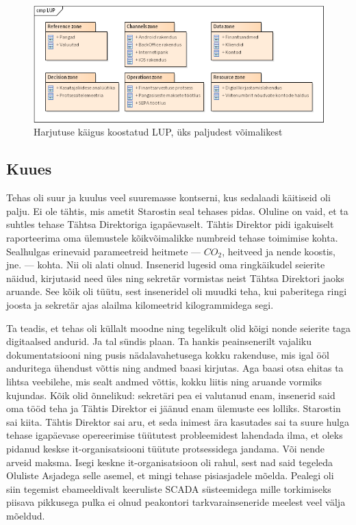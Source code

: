\documentclass[nobib]{tufte-handout}
\begin{document}
\begin{figure}%
\begin{center}
  \includegraphics[width=\linewidth]{harjutus_lup}
  \caption{Harjutuse käigus koostatud LUP, üks paljudest võimalikest}
  \label{fig:harjutus}
\end{center}
\end{figure}

\subsection{Kuues}
 Tehas oli suur ja kuulus veel suuremasse kontserni, kus sedalaadi käitiseid oli palju. Ei ole tähtis, mis ametit Starostin seal tehases pidas. Oluline on vaid, et ta suhtles tehase Tähtsa Direktoriga igapäevaselt. Tähtis Direktor pidi igakuiselt raporteerima oma ülemustele kõikvõimalikke numbreid tehase toimimise kohta. Sealhulgas erinevaid parameetreid heitmete --- $CO_2$, heitveed ja nende koostis, jne. --- kohta. Nii oli alati olnud. Insenerid lugesid oma ringkäikudel seierite näidud, kirjutasid need üles ning sekretär vormistas neist Tähtsa Direktori jaoks aruande. See kõik oli tüütu, sest inseneridel oli muudki teha, kui paberitega ringi joosta ja sekretär ajas alailma kilomeetrid kilogrammidega segi. 

 Ta teadis, et tehas oli küllalt moodne ning tegelikult olid kõigi nonde seierite taga digitaalsed andurid. Ja tal sündis plaan. Ta hankis peainsenerilt vajaliku dokumentatsiooni ning pusis nädalavahetusega kokku rakenduse, mis igal ööl anduritega ühendust võttis ning andmed baasi kirjutas. Aga baasi otsa ehitas ta lihtsa veebilehe, mis sealt andmed võttis, kokku liitis ning aruande vormiks kujundas. Kõik olid õnnelikud: sekretäri pea ei valutanud enam, insenerid said oma tööd teha ja Tähtis Direktor ei jäänud enam ülemuste ees lolliks. Starostin sai kiita. Tähtis Direktor sai aru, et seda inimest ära kasutades sai ta suure hulga tehase igapäevase opereerimise tüütutest probleemidest lahendada ilma, et oleks pidanud keskse it-organisatsiooni tüütute protsessidega jandama. Või nende arveid maksma. Isegi keskne it-organisatsioon oli rahul, sest nad said tegeleda Oluliste Asjadega selle asemel, et mingi tehase pisiasjadele mõelda. Pealegi oli siin tegemist ebameeldivalt keeruliste SCADA süsteemidega mille torkimiseks piisava pikkusega pulka ei olnud peakontori tarkvarainseneride meelest veel välja mõeldud. 
\end{document}
